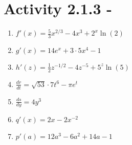 


%


\allowdisplaybreaks
\section{Activity 2.1.3  -  }


\everymath{\displaystyle}
\begin{enumerate}[label=(\alph*), leftmargin=0pt]

\item $f'(x) = \frac{5}{3}x^{2/3} - 4 x^3 + 2^x \ln(2)$
\item $g'(x) = 14e^x + 3 \cdot 5x^4 - 1$
\item $h'(z) = \frac{1}{2}z^{-1/2} - 4z^{-5} + 5^z \ln(5)$
\item $\frac{dr}{dt} = \sqrt{53} \cdot 7 t^6 - \pi e^t$
\item $\frac{ds}{dy} = 4y^3$
\item $q'(x) = 2x - 2x^{-2}$
\item $p'(a) = 12a^3 - 6 a^2 + 14a - 1$


\end{enumerate}
